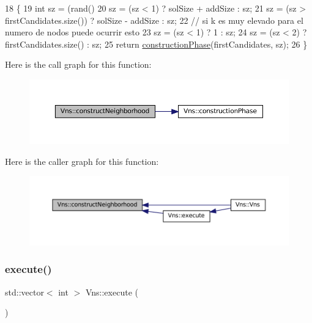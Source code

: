 \begin{DoxyCode}
18 \{
19   \textcolor{keywordtype}{int} sz = (rand() %
20   sz = (sz < 1) ? solSize + addSize : sz;
21   sz = (sz > firstCandidates.size()) ? solSize - addSize : sz;
22   \textcolor{comment}{// si k es muy elevado para el numero de nodos puede ocurrir esto}
23   sz = (sz < 1) ? 1 : sz;
24   sz = (sz < 2) ? firstCandidates.size() : sz;
25   \textcolor{keywordflow}{return} \hyperlink{classVns_aefd9719db68183a6b2ec871c86226ee4}{constructionPhase}(firstCandidates, sz);
26 \}
\end{DoxyCode}
Here is the call graph for this function\+:\nopagebreak
\begin{figure}[H]
\begin{center}
\leavevmode
\includegraphics[width=350pt]{classVns_a8eee9f0e31bb41bcd7bd00c46170e5b9_cgraph}
\end{center}
\end{figure}
Here is the caller graph for this function\+:\nopagebreak
\begin{figure}[H]
\begin{center}
\leavevmode
\includegraphics[width=350pt]{classVns_a8eee9f0e31bb41bcd7bd00c46170e5b9_icgraph}
\end{center}
\end{figure}
\mbox{\label{classVns_aece2ea2cb74dd3608570321fcbb2de0c}} 
\subsubsection{\texorpdfstring{execute()}{execute()}}
{\footnotesize\ttfamily std\+::vector$<$ int $>$ Vns\+::execute (\begin{DoxyParamCaption}{ }\end{DoxyParamCaption})\hspace{0.3cm}{\ttfamily [virtual]}}



